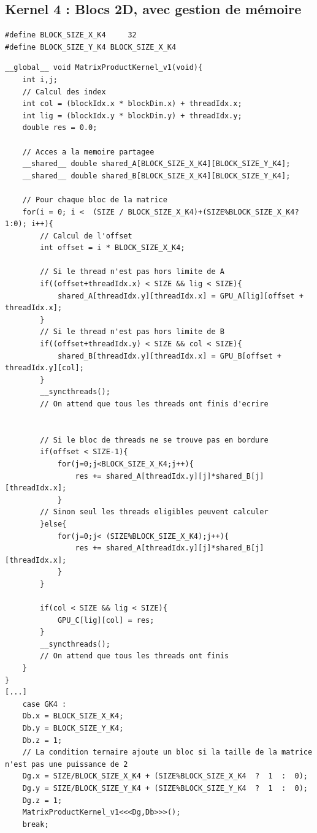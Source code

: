 \documentclass[	DIV=calc,%
							paper=a4,%
							fontsize=11pt%
							]{scrartcl}	 					%
\begin{document}
\subsection{Kernel 4 : Blocs 2D, avec gestion de mémoire}
\begin{lstlisting}
#define BLOCK_SIZE_X_K4     32
#define BLOCK_SIZE_Y_K4 BLOCK_SIZE_X_K4
\end{lstlisting}
\begin{lstlisting}
__global__ void MatrixProductKernel_v1(void){
	int i,j;
	// Calcul des index
	int col = (blockIdx.x * blockDim.x) + threadIdx.x;
	int lig = (blockIdx.y * blockDim.y) + threadIdx.y;
	double res = 0.0;
		
	// Acces a la memoire partagee 
	__shared__ double shared_A[BLOCK_SIZE_X_K4][BLOCK_SIZE_Y_K4];
	__shared__ double shared_B[BLOCK_SIZE_X_K4][BLOCK_SIZE_Y_K4];
	
	// Pour chaque bloc de la matrice
	for(i = 0; i <	(SIZE / BLOCK_SIZE_X_K4)+(SIZE%BLOCK_SIZE_X_K4?1:0); i++){
		// Calcul de l'offset 
		int offset = i * BLOCK_SIZE_X_K4;
		
		// Si le thread n'est pas hors limite de A
		if((offset+threadIdx.x) < SIZE && lig < SIZE){
			shared_A[threadIdx.y][threadIdx.x] = GPU_A[lig][offset + threadIdx.x];
		}
		// Si le thread n'est pas hors limite de B
		if((offset+threadIdx.y) < SIZE && col < SIZE){
			shared_B[threadIdx.y][threadIdx.x] = GPU_B[offset + threadIdx.y][col];
		}
		__syncthreads();
		// On attend que tous les threads ont finis d'ecrire	
		
		
		// Si le bloc de threads ne se trouve pas en bordure
		if(offset < SIZE-1){
			for(j=0;j<BLOCK_SIZE_X_K4;j++){
				res += shared_A[threadIdx.y][j]*shared_B[j][threadIdx.x];
			}
		// Sinon seul les threads eligibles peuvent calculer
		}else{
			for(j=0;j< (SIZE%BLOCK_SIZE_X_K4);j++){
				res += shared_A[threadIdx.y][j]*shared_B[j][threadIdx.x];			
			}			
		}
		
		if(col < SIZE && lig < SIZE){
			GPU_C[lig][col] = res;
		}
		__syncthreads();
		// On attend que tous les threads ont finis
	}
}
[...]
	case GK4 :
	Db.x = BLOCK_SIZE_X_K4;
	Db.y = BLOCK_SIZE_Y_K4;
	Db.z = 1;
	// La condition ternaire ajoute un bloc si la taille de la matrice n'est pas une puissance de 2
	Dg.x = SIZE/BLOCK_SIZE_X_K4 + (SIZE%BLOCK_SIZE_X_K4  ?  1  :  0);
	Dg.y = SIZE/BLOCK_SIZE_Y_K4 + (SIZE%BLOCK_SIZE_Y_K4  ?  1  :  0);
	Dg.z = 1;
	MatrixProductKernel_v1<<<Dg,Db>>>();
	break;	
\end{lstlisting}
\end{document}
